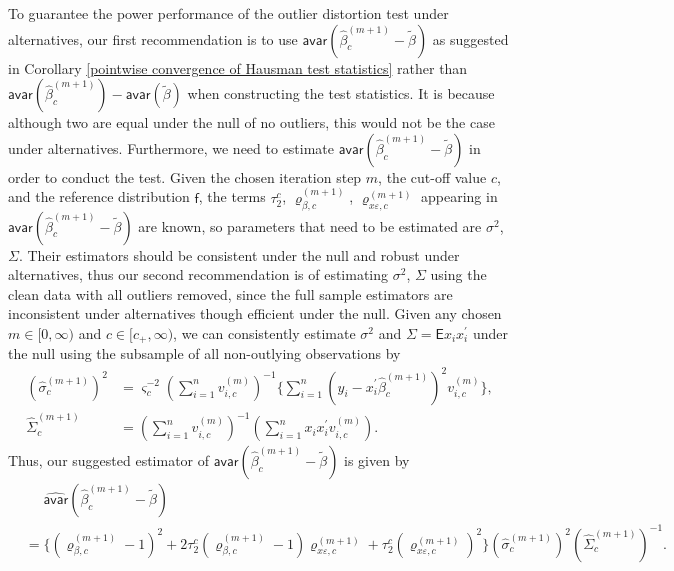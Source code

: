\documentclass[11pt, letterpaper]{article}
\numberwithin{algorithm}{section}
\numberwithin{assumption}{section}
\numberwithin{lemma}{section}
\numberwithin{theorem}{section}
\numberwithin{corollary}{section}
\numberwithin{remark}{section}
\numberwithin{equation}{section}
\numberwithin{figure}{section}
\numberwithin{table}{section}
\begin{document}
To guarantee the power performance of the outlier distortion test under alternatives, our first recommendation is to use $\mathsf{avar}(\widehat{\beta}_{c}^{(m + 1)} - \widetilde{\beta})$ as suggested in Corollary \ref{pointwise convergence of Hausman test statistics} rather than $\mathsf{avar}(\widehat{\beta}_{c}^{(m + 1)}) - \mathsf{avar}(\widetilde{\beta})$ when constructing the test statistics. It is because although two are equal under the null of no outliers, this would not be the case under alternatives. Furthermore, we need to estimate $\mathsf{avar}(\widehat{\beta}_{c}^{(m + 1)} - \widetilde{\beta})$ in order to conduct the test. Given the chosen iteration step $m$, the cut-off value $c$, and the reference distribution $\mathsf{f}$, the terms $\tau_{2}^{c}$, $\varrho_{\beta, c}^{(m + 1)}$, $\varrho_{x \varepsilon, c}^{(m + 1)}$ appearing in $\mathsf{avar}(\widehat{\beta}_{c}^{(m + 1)} - \widetilde{\beta})$ are known, so parameters that need to be estimated are $\sigma^{2}$, $\Sigma$. Their estimators should be consistent under the null and robust under alternatives, thus our second recommendation is of estimating $\sigma^{2}$, $\Sigma$ using the clean data with all outliers removed, since the full sample estimators are inconsistent under alternatives though efficient under the null. Given any chosen $m \in [0, \infty)$ and $c \in [c_{+}, \infty)$, we can consistently estimate $\sigma^{2}$ and $\Sigma = \mathsf{E} x_{i} x_{i}^{\prime}$ under the null using the subsample of all non-outlying observations by
\begin{align*}
(\widehat{\sigma}_{c}^{(m+1)})^{2} & = \varsigma_{c}^{-2} (\sum_{i=1}^{n} v_{i, c}^{(m)})^{-1} \{ \sum_{i=1}^{n} (y_{i} - x_{i}^{\prime} \widehat{\beta}_{c}^{(m+1)})^{2} v_{i, c}^{(m)} \}, \\
\widehat{\Sigma}_{c}^{(m + 1)} & = (\sum_{i = 1}^{n} v_{i, c}^{(m)})^{-1} (\sum_{i = 1}^{n} x_{i} x_{i}^{\prime} v_{i, c}^{(m)}).
\end{align*}
Thus, our suggested estimator of $\mathsf{avar}(\widehat{\beta}_{c}^{(m + 1)} - \widetilde{\beta})$ is given by
\begin{align}
& \quad \,\, \widehat{\mathsf{avar}}(\widehat{\beta}_{c}^{(m + 1)} - \widetilde{\beta}) \nonumber \\
& = \{ (\varrho_{\beta, c}^{(m + 1)} - 1)^{2} + 2 \tau_{2}^{c} (\varrho_{\beta, c}^{(m + 1)} - 1) \varrho_{x \varepsilon, c}^{(m + 1)} + \tau_{2}^{c} (\varrho_{x \varepsilon, c}^{(m + 1)})^{2} \} (\widehat{\sigma}_{c}^{(m + 1)})^{2} (\widehat{\Sigma}_{c}^{(m + 1)})^{-1}. \label{estimated asymptotic variance}
\end{align}
\end{document}
